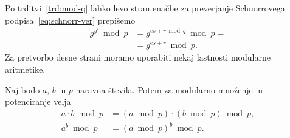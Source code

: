 \documentclass[isrm2, tisk]{fmfdelo}
\begin{document}
Po trditvi~\ref{trd:mod-q} lahko levo stran enačbe za preverjanje Schnorrovega podpisa~\eqref{eq:schnorr-ver}
prepišemo
\begin{align*}
    g^{y'} \bmod p &= g^{es + r \bmod q} \bmod p = \\ 
                   &= g^{es + r} \bmod p. 
\end{align*}
Za pretvorbo desne strani moramo uporabiti nekaj lastnosti modularne aritmetike.

\begin{trditev}
\label{trd:mod-mn-pt}
    Naj bodo $a$, $b$ in $p$ naravna števila. Potem za modularno množenje in potenciranje velja
    \begin{align}
        a \cdot b \bmod p &= (a \bmod p) \cdot (b \bmod p) \bmod p, \label{eq:mod-prod} \\
        a^b \bmod p &= (a \bmod p)^b \bmod p. \label{eq:mod-exp} 
    \end{align}
\end{trditev}
\end{document}
